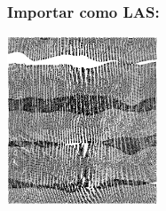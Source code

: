 \begin{frame}
  \frametitle{Importar como LAS: \LARGE{}}
 \begin{center}
 \includegraphics[height=50mm]{images/vinascii_strips}
 \end{center}
\end{frame}
